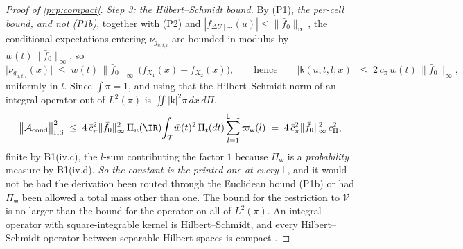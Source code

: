 \begin{proof}[Proof of \cref{prp:compact}]
\emph{Step 3: the Hilbert--Schmidt bound.}
By (P1), \emph{the per-cell bound, and not \textup{(P1b)}}, together with (P2) and
$|f_{\Delta U\mid\cdots}(u)|\le\|\bar f_0\|_\infty$, the conditional expectations
entering $\nu_{g_{u,t,l}}$ are bounded in modulus by $\bar w(t)\|\bar f_0\|_\infty$, so
\[
\big|\nu_{g_{u,t,l}}(x)\big|\;\le\;\bar w(t)\,\|\bar f_0\|_\infty\,\big(f_{X_1}(x)+f_{X_2}(x)\big),
\qquad\text{hence}\qquad
\big|\mathsf k(u,t,l;x)\big|\;\le\;2\,\bar c_\pi\,\bar w(t)\,\|\bar f_0\|_\infty ,
\]
uniformly in $l$. Since $\int\pi=1$, and using that the Hilbert--Schmidt norm of an integral operator out
of $L^{2}(\pi)$ is $\iint|\mathsf k|^{2}\pi\,dx\,d\Pi$,
\[
\big\|\mathcal A_{\mathrm{cond}}\big\|^{2}_{\mathrm{HS}}
\;\le\;4\,\bar c_\pi^{2}\|\bar f_0\|^{2}_\infty\,\Pi_u(\IR)\!\int_{\mathcal T}\!\bar w(t)^{2}\,\Pi_t(dt)
\sum_{l=1}^{\mathsf L-1}\varpi_{\mathsf w}(l)
\;=\;4\,\bar c_\pi^{2}\|\bar f_0\|^{2}_\infty\,c_\Pi^{2},
\]
finite by B1(iv.c), the $l$-sum contributing the factor $1$ because $\Pi_{\mathsf w}$ is a
\emph{probability} measure by B1(iv.d). \emph{So the constant is the printed one at every $\mathsf L$},
and it would not be had the derivation been routed through the Euclidean bound \textup{(P1b)} or had
$\Pi_{\mathsf w}$ been allowed a total mass other than one. The bound for the restriction to $\mathcal V$ is no larger than the bound for the
operator on all of $L^{2}(\pi)$. An integral operator with square-integrable kernel is
Hilbert--Schmidt, and every Hilbert--Schmidt operator between separable Hilbert spaces is compact
\citep[Prop.~II.4.7]{conway1990}.


\end{proof}
